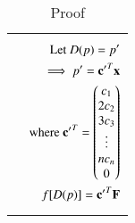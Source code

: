 \begin{table*}[!t]
\begin{tabular}{|l|l|}
      & 
        \parbox{10cm}{\begin{align}
        \text{Let  }D(p)=p'\\
         \implies p'=\mathbf{c'}^T\mathbf{x}\\
         \text{where }\mathbf{c'}^T=\begin{pmatrix}c_1\\2c_2\\3c_3\\\vdots\\nc_n\\0\end{pmatrix}\\
         f[D(p)]=\mathbf{c'}^T\mathbf{F}
       \end{align}}\\
       \hline
      $(D^t f)(p)=p(b)-p(a)$ & 
         \parbox{10cm}{\begin{align}
         (D^t f)(p)=c_1(b-a)+c_2(b^2-a^2)+\\\hdots+c_n(b^n-a^n)+c_0-c_0\\
         =(c_0+c_1b+c_2b^2+\hdots+c_nb^n)-\\
         (c_0+c_1a+c_2a^2+\hdots+c_na^n)\\
         =p(b)-p(a)
       \end{align}}\\
       \hline
    \end{tabular}
    \caption{Proof}
\label{eq:solutions/3/7/6table:2}
\end{table*}


